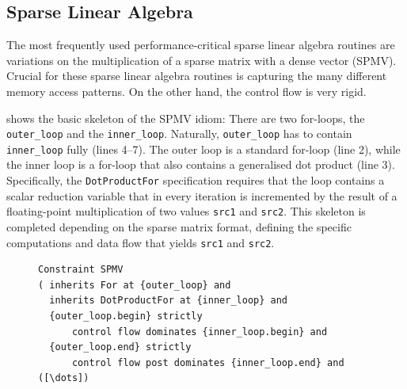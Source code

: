 \subsection{Sparse Linear Algebra}

    The most frequently used performance-critical sparse linear algebra routines
    are variations on the multiplication of a sparse matrix with a dense vector
    (SPMV).
    Crucial for these sparse linear algebra routines is capturing the many
    different memory access patterns.
    On the other hand, the control flow is very rigid.

     shows the basic skeleton of the SPMV idiom:
    There are two for-loops, the {\tt outer\_loop} and the {\tt inner\_loop}.
    Naturally, {\tt outer\_loop} has to contain {\tt inner\_loop} fully
    (lines 4--7).
    The outer loop is a standard for-loop (line 2), while the inner loop is a
    for-loop that also contains a generalised dot product (line 3).
    Specifically, the {\tt DotProductFor} specification requires that the
    loop contains a scalar reduction variable that in every iteration is
    incremented by the result of a floating-point multiplication of two values
    {\tt src1} and {\tt src2}.
    This skeleton is completed depending on the sparse matrix format, defining
    the specific computations and data flow that yields {\tt src1} and
    {\tt src2}.

\begin{figure}[p]
\begin{lstlisting}[language=IDL, label={spmvbase}, caption=
   {Skeleton of the sparse matrix-vector product (SPMV) constraint
    specification in IDL: The precise sparse access patterns are specific to
    chosen storage formats for sparse matrices.}]
Constraint SPMV
( inherits For at {outer_loop} and
  inherits DotProductFor at {inner_loop} and
  {outer_loop.begin} strictly
      control flow dominates {inner_loop.begin} and
  {outer_loop.end} strictly
      control flow post dominates {inner_loop.end} and
([\dots])
\end{lstlisting}
\end{figure}


